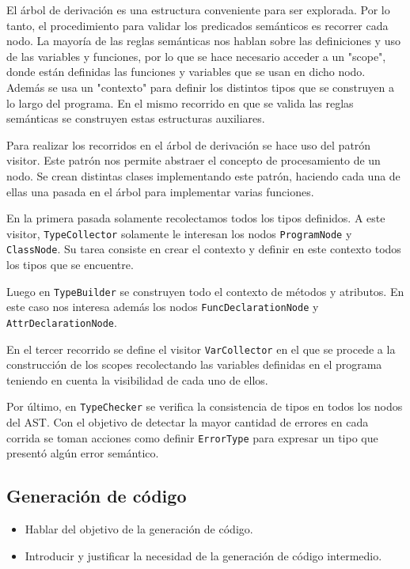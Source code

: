 \documentclass[11pt]{scrartcl} %
\begin{document}
El árbol de derivación es una estructura conveniente para ser explorada. Por lo tanto, el procedimiento para validar los predicados semánticos es recorrer cada nodo. La mayoría de las reglas semánticas nos hablan sobre las definiciones y uso de las variables y funciones, por lo que se hace necesario acceder a un "scope", donde están definidas las funciones y variables que se usan en dicho nodo. Además se usa un "contexto" para definir los distintos tipos que se construyen a lo largo del programa. En el mismo recorrido en que se valida las reglas semánticas se construyen estas estructuras auxiliares.

Para realizar los recorridos en el árbol de derivación se hace uso del patrón visitor. Este patrón nos permite abstraer el concepto de procesamiento de un nodo. Se crean distintas clases implementando este patrón, haciendo cada una de ellas una pasada en el árbol para implementar varias funciones.

En la primera pasada solamente recolectamos todos los tipos definidos. A este visitor, \texttt{TypeCollector} solamente le interesan los nodos \texttt{ProgramNode} y \texttt{ClassNode}. Su tarea consiste en crear el contexto y definir en este contexto todos los tipos que se encuentre.

Luego en \texttt{TypeBuilder} se construyen todo el contexto de métodos y atributos. En este caso nos interesa además los nodos \texttt{FuncDeclarationNode} y \texttt{AttrDeclarationNode}.

En el tercer recorrido se define el visitor \texttt{VarCollector} en el que se procede a la construcción de los scopes recolectando las variables definidas en el programa teniendo en cuenta la visibilidad de cada uno de ellos.

Por último, en \texttt{TypeChecker} se verifica la consistencia de tipos en todos los nodos del AST. Con el objetivo de detectar la mayor cantidad de errores en cada corrida se toman acciones como definir \texttt{ErrorType} para expresar un tipo que presentó algún error semántico.

\subsection{Generación de código}

\begin{itemize}
	\item Hablar del objetivo de la generación de código.
	\item Introducir y justificar la necesidad de la generación de código intermedio.
\end{itemize}
\end{document}
